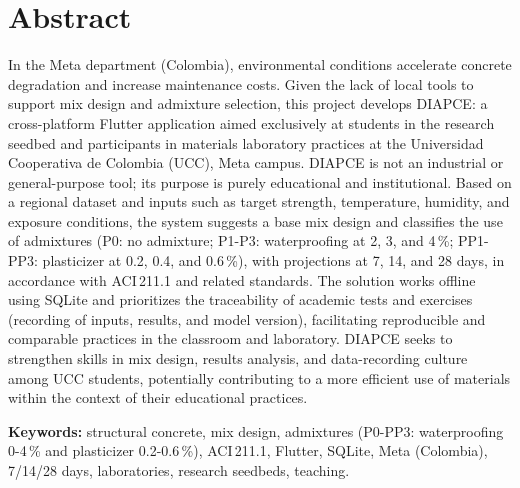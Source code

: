 \section*{Abstract}

In the Meta department (Colombia), environmental conditions accelerate concrete degradation and increase maintenance costs. Given the lack of local tools to support mix design and admixture selection, this project develops DIAPCE: a cross-platform Flutter application aimed exclusively at students in the research seedbed and participants in materials laboratory practices at the Universidad Cooperativa de Colombia (UCC), Meta campus. DIAPCE is not an industrial or general-purpose tool; its purpose is purely educational and institutional. Based on a regional dataset and inputs such as target strength, temperature, humidity, and exposure conditions, the system suggests a base mix design and classifies the use of admixtures (P0: no admixture; P1-P3: waterproofing at 2, 3, and 4\,\%; PP1-PP3: plasticizer at 0.2, 0.4, and 0.6\,\%), with projections at 7, 14, and 28 days, in accordance with ACI\,211.1 and related standards. The solution works offline using SQLite and prioritizes the traceability of academic tests and exercises (recording of inputs, results, and model version), facilitating reproducible and comparable practices in the classroom and laboratory. DIAPCE seeks to strengthen skills in mix design, results analysis, and data-recording culture among UCC students, potentially contributing to a more efficient use of materials within the context of their educational practices.

\vspace{0.5em}
\noindent\textbf{Keywords:} structural concrete, mix design, admixtures (P0-PP3: waterproofing 0-4\,\% and plasticizer 0.2-0.6\,\%), ACI\,211.1, Flutter, SQLite, Meta (Colombia), 7/14/28 days, laboratories, research seedbeds, teaching.
